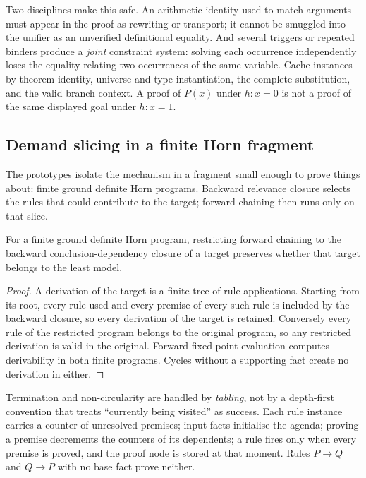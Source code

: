 Two disciplines make this safe. An arithmetic identity used to match arguments
must appear in the proof as rewriting or transport; it cannot be smuggled into
the unifier as an unverified definitional equality. And several triggers or
repeated binders produce a \emph{joint} constraint system: solving each
occurrence independently loses the equality relating two occurrences of the
same variable. Cache instances by theorem identity, universe and type
instantiation, the complete substitution, and the valid branch context. A proof
of $P(x)$ under $h:x=0$ is not a proof of the same displayed goal under
$h:x=1$.

\subsection{Demand slicing in a finite Horn fragment}

The prototypes isolate the mechanism in a fragment small enough to prove things
about: finite ground definite Horn programs. Backward relevance closure selects
the rules that could contribute to the target; forward chaining then runs only
on that slice.

\begin{proposition}
\label{prop:slicing}
For a finite ground definite Horn program, restricting forward chaining to the
backward conclusion-dependency closure of a target preserves whether that target
belongs to the least model.
\end{proposition}
\begin{proof}
A derivation of the target is a finite tree of rule applications. Starting from
its root, every rule used and every premise of every such rule is included by
the backward closure, so every derivation of the target is retained. Conversely
every rule of the restricted program belongs to the original program, so any
restricted derivation is valid in the original. Forward fixed-point evaluation
computes derivability in both finite programs. Cycles without a supporting fact
create no derivation in either.
\end{proof}

Termination and non-circularity are handled by \emph{tabling}, not by a
depth-first convention that treats ``currently being visited'' as success. Each
rule instance carries a counter of unresolved premises; input facts initialise
the agenda; proving a premise decrements the counters of its dependents; a rule
fires only when every premise is proved, and the proof node is stored at that
moment. Rules $P\to Q$ and $Q\to P$ with no base fact prove neither.

